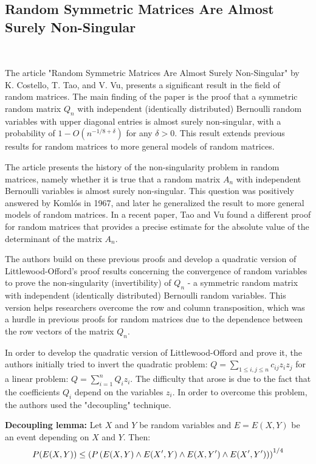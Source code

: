 
\subsection{Random Symmetric Matrices Are Almost Surely Non-Singular}

~\cite{costello2005random}

The article "Random Symmetric Matrices Are Almost Surely Non-Singular" by K. Costello, T. Tao, and V. Vu, presents a significant result in the field of random matrices. The main finding of the paper is the proof that a symmetric random matrix \( Q_n \) with independent (identically distributed) Bernoulli random variables with upper diagonal entries is almost surely non-singular, with a probability of  \( 1-O(n^{-1/8+\delta}) \) for any \( \delta>0 \). This result extends previous results for random matrices to more general models of random matrices.

The article presents the history of the non-singularity problem in random matrices, namely whether it is true that a random matrix \( A_n \) with independent Bernoulli variables is almost surely non-singular. This question was positively answered by Komlós in 1967, and later he generalized the result to more general models of random matrices. In a recent paper, Tao and Vu found a different proof for random matrices that provides a precise estimate for the absolute value of the determinant of the matrix \( A_n \).

The authors build on these previous proofs and develop a quadratic version of Littlewood-Offord's proof results concerning the convergence of random variables to prove the non-singularity (invertibility) of \( Q_n \) - a symmetric random matrix with independent (identically distributed) Bernoulli random variables. This version helps researchers overcome the row and column transposition, which was a hurdle in previous proofs for random matrices due to the dependence between the row vectors of the matrix \( Q_n \).

In order to develop the quadratic version of Littlewood-Offord and prove it, the authors initially tried to invert the quadratic problem: \( Q=\sum_{1\leq i,j\leq n} c_{ij} z_i z_j \) for a linear problem: \( Q=\sum_{i=1}^n Q_i z_i \). The difficulty that arose is due to the fact that the coefficients \( Q_i \) depend on the variables \( z_i \). In order to overcome this problem, the authors used the "decoupling" technique.
\vspace{\baselineskip}

\textbf{Decoupling lemma:} Let \( X \) and \( Y \) be random variables and \( E=E(X,Y) \) be an event depending on \( X \) and \( Y \). Then:
\vspace{-0.6\baselineskip}
\[ P(E(X,Y)) \leq \left( P\left( E(X,Y) \land E(X',Y) \land E(X,Y') \land E(X',Y') \right) \right)^{1/4} \vspace{-0.5\baselineskip} \]

